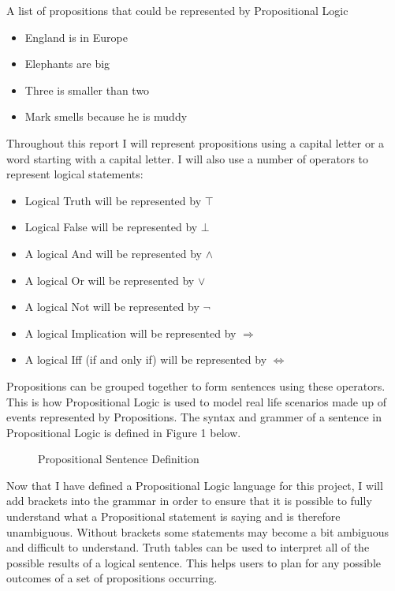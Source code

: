 \begin{exmp}A list of propositions that could be represented by Propositional Logic
\begin{itemize}
\item England is in Europe
\item Elephants are big
\item Three is smaller than two
\item Mark smells because he is muddy
\end{itemize}
\end{exmp}

Throughout this report I will represent propositions using a capital letter or a word starting with a capital letter. I will also use a number of operators to represent logical statements:
\begin{itemize}
\item Logical Truth will be represented by $\top$
\item Logical False will be represented by $\bot$
\item A logical And will be represented by $\wedge$
\item A logical Or will be represented by $\vee$
\item A logical Not will be represented by $\neg$
\item A logical Implication will be represented by $\Rightarrow$
\item A logical Iff (if and only if) will be represented by $\Leftrightarrow$
\end{itemize}

Propositions can be grouped together to form sentences using these operators. This is how Propositional Logic is used to model real life scenarios made up of events represented by Propositions. The syntax and grammer of a sentence in Propositional Logic is defined in Figure 1 below.

\begin{figure}[!ht]
	
	\noindent{}
	\caption{Propositional Sentence Definition}
\end{figure}

Now that I have defined a Propositional Logic language for this project, I will add brackets into the grammar in order to ensure that it is possible to fully understand what a Propositional statement is saying and is therefore unambiguous. Without brackets some statements may become a bit ambiguous and difficult to understand. Truth tables can be used to interpret all of the possible results of a logical sentence. This helps users to plan for any possible outcomes of a set of propositions occurring.

